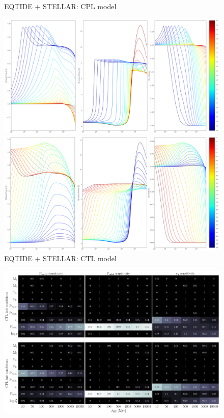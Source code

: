\documentclass[]{aastex631}
\begin{document}
\begin{figure}[ht!]
\begin{center}
	\caption{EQTIDE + STELLAR: CPL model}
	\includegraphics[width=\linewidth]{../analysis/results_likelihood_1d/cpl_stellar_eqtide/plots/vary_q_evolution.png} 
	\caption{EQTIDE + STELLAR: CTL model}
	\includegraphics[width=\linewidth]{../analysis/results_likelihood_1d/ctl_stellar_eqtide/plots/vary_tau_evolution.png} 
\end{center}
\end{figure}

\begin{figure}[ht!]
\begin{center}
	\includegraphics[width=\linewidth]{../figures/sensitivity_ctl.png} 
	\includegraphics[width=\linewidth]{../figures/sensitivity_cpl.png}
\end{center}
\end{figure}
\end{document}
